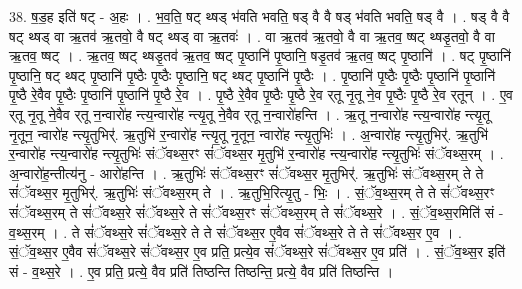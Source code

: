 \documentclass[17pt]{extarticle}
\begin{document}
38. ष॒ड॒ह इति॑ षट् - अ॒हः । . भ॒व॒ति॒ षट् थ्षड् भ॑वति भवति॒ षड् वै वै षड् भ॑वति भवति॒ षड् वै । . षड् वै वै षट् थ्षड् वा ऋ॒तव॑ ऋ॒तवो॒ वै षट् थ्षड् वा ऋ॒तवः॑ । . वा ऋ॒तव॑ ऋ॒तवो॒ वै वा ऋ॒तव॒ ष्षट् थ्षडृ॒तवो॒ वै वा ऋ॒तव॒ ष्षट् । . ऋ॒तव॒ ष्षट् थ्षडृ॒तव॑ ऋ॒तव॒ ष्षट् पृ॒ष्ठानि॑ पृ॒ष्ठानि॒ षडृ॒तव॑ ऋ॒तव॒ ष्षट् पृ॒ष्ठानि॑ । . षट् पृ॒ष्ठानि॑ पृ॒ष्ठानि॒ षट् थ्षट् पृ॒ष्ठानि॑ पृ॒ष्ठैः पृ॒ष्ठैः पृ॒ष्ठानि॒ षट् थ्षट् पृ॒ष्ठानि॑ पृ॒ष्ठैः । . पृ॒ष्ठानि॑ पृ॒ष्ठैः पृ॒ष्ठैः पृ॒ष्ठानि॑ पृ॒ष्ठानि॑ पृ॒ष्ठै रे॒वैव पृ॒ष्ठैः पृ॒ष्ठानि॑ पृ॒ष्ठानि॑ पृ॒ष्ठै रे॒व । . पृ॒ष्ठै रे॒वैव पृ॒ष्ठैः पृ॒ष्ठै रे॒व र्‌तू नृ॒तू ने॒व पृ॒ष्ठैः पृ॒ष्ठै रे॒व र्‌तून् । . ए॒व र्‌तू नृ॒तू ने॒वैव र्‌तू न॒न्वारो॑ह न्त्य॒न्वारो॑ह न्त्यृ॒तू ने॒वैव र्‌तू न॒न्वारो॑हन्ति । . ऋ॒तू न॒न्वारो॑ह न्त्य॒न्वारो॑ह न्त्यृ॒तू नृ॒तून॒ न्वारो॑ह न्त्यृ॒तुभिर्॑. ऋ॒तुभि॑ र॒न्वारो॑ह न्त्यृ॒तू नृ॒तून॒ न्वारो॑ह न्त्यृ॒तुभिः॑ । . अ॒न्वारो॑ह न्त्यृ॒तुभिर्॑. ऋ॒तुभि॑ र॒न्वारो॑ह न्त्य॒न्वारो॑ह न्त्यृ॒तुभिः॑ संॅवथ्स॒रꣳ सं॑ॅवथ्स॒र मृ॒तुभि॑ र॒न्वारो॑ह न्त्य॒न्वारो॑ह न्त्यृ॒तुभिः॑ संॅवथ्स॒रम् । . अ॒न्वारो॑ह॒न्तीत्य॑नु - आरो॑हन्ति । . ऋ॒तुभिः॑ संॅवथ्स॒रꣳ सं॑ॅवथ्स॒र मृ॒तुभिर्॑. ऋ॒तुभिः॑ संॅवथ्स॒रम् ते ते सं॑ॅवथ्स॒र मृ॒तुभिर्॑. ऋ॒तुभिः॑ संॅवथ्स॒रम् ते । . ऋ॒तुभि॒रित्यृ॒तु - भिः॒ । . सं॒ॅव॒थ्स॒रम् ते ते सं॑ॅवथ्स॒रꣳ सं॑ॅवथ्स॒रम् ते सं॑ॅवथ्स॒रे सं॑ॅवथ्स॒रे ते सं॑ॅवथ्स॒रꣳ सं॑ॅवथ्स॒रम् ते सं॑ॅवथ्स॒रे । . सं॒ॅव॒थ्स॒रमिति॑ सं - व॒थ्स॒रम् । . ते सं॑ॅवथ्स॒रे सं॑ॅवथ्स॒रे ते ते सं॑ॅवथ्स॒र ए॒वैव सं॑ॅवथ्स॒रे ते ते सं॑ॅवथ्स॒र ए॒व । . सं॒ॅव॒थ्स॒र ए॒वैव सं॑ॅवथ्स॒रे सं॑ॅवथ्स॒र ए॒व प्रति॒ प्रत्ये॒व सं॑ॅवथ्स॒रे सं॑ॅवथ्स॒र ए॒व प्रति॑ । . सं॒ॅव॒थ्स॒र इति॑ सं - व॒थ्स॒रे । . ए॒व प्रति॒ प्रत्ये॒ वैव प्रति॑ तिष्ठन्ति तिष्ठन्ति॒ प्रत्ये॒ वैव प्रति॑ तिष्ठन्ति । \newline
\end{document}

